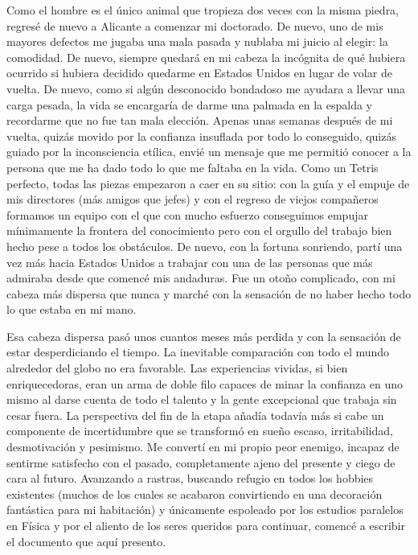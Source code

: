 Como el hombre es el único animal que tropieza dos veces con la misma piedra, regresé de nuevo a Alicante a comenzar mi doctorado. De nuevo, uno de mis mayores defectos me jugaba una mala pasada y nublaba mi juicio al elegir: la comodidad. De nuevo, siempre quedará en mi cabeza la incógnita de qué hubiera ocurrido si hubiera decidido quedarme en Estados Unidos en lugar de volar de vuelta. De nuevo, como si algún desconocido bondadoso me ayudara a llevar una carga pesada, la vida se encargaría de darme una palmada en la espalda y recordarme que no fue tan mala elección. Apenas unas semanas después de mi vuelta, quizás movido por la confianza insuflada por todo lo conseguido, quizás guiado por la inconsciencia etílica, envié un mensaje que me permitió conocer a la persona que me ha dado todo lo que me faltaba en la vida. Como un Tetris perfecto, todas las piezas empezaron a caer en su sitio: con la guía y el empuje de mis directores (más amigos que jefes) y con el regreso de viejos compañeros formamos un equipo con el que con mucho esfuerzo conseguimos empujar mínimamente la frontera del conocimiento pero con el orgullo del trabajo bien hecho pese a todos los obstáculos. De nuevo, con la fortuna sonriendo, partí una vez más hacia Estados Unidos a trabajar con una de las personas que más admiraba desde que comencé mis andaduras. Fue un otoño complicado, con mi cabeza más dispersa que nunca y marché con la sensación de no haber hecho todo lo que estaba en mi mano.

Esa cabeza dispersa pasó unos cuantos meses más perdida y con la sensación de estar desperdiciando el tiempo. La inevitable comparación con todo el mundo alrededor del globo no era favorable. Las experiencias vividas, si bien enriquecedoras, eran un arma de doble filo capaces de minar la confianza en uno mismo al darse cuenta de todo el talento y la gente excepcional que trabaja sin cesar fuera. La perspectiva del fin de la etapa añadía todavía más si cabe un componente de incertidumbre que se transformó en sueño escaso, irritabilidad, desmotivación y pesimismo. Me convertí en mi propio peor enemigo, incapaz de sentirme satisfecho con el pasado, completamente ajeno del presente y ciego de cara al futuro. Avanzando a rastras, buscando refugio en todos los hobbies existentes (muchos de los cuales se acabaron convirtiendo en una decoración fantástica para mi habitación) y únicamente espoleado por los estudios paralelos en Física y por el aliento de los seres queridos para continuar, comencé a escribir el documento que aquí presento.

